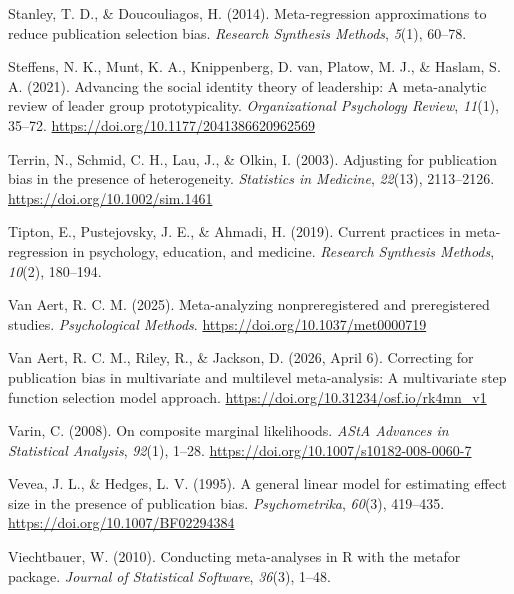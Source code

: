 \documentclass[
  american,
  man, donotrepeattitle,floatsintext]{apa7}
\newlength{\cslhangindent}
\newenvironment{CSLReferences}[2] %
 {\begin{list}{}{%
  \setlength{\itemindent}{0pt}
  \setlength{\leftmargin}{0pt}
  \setlength{\parsep}{0pt}
  \ifodd #1
   \setlength{\leftmargin}{\cslhangindent}
   \setlength{\itemindent}{-1\cslhangindent}
  \fi
  \setlength{\itemsep}{#2\baselineskip}}}
 {\end{list}}
\begin{document}
\begin{CSLReferences}{1}{0}
Stanley, T. D., \& Doucouliagos, H. (2014). Meta-regression approximations to reduce publication selection bias. \emph{Research Synthesis Methods}, \emph{5}(1), 60--78.

Steffens, N. K., Munt, K. A., Knippenberg, D. van, Platow, M. J., \& Haslam, S. A. (2021). Advancing the social identity theory of leadership: A meta-analytic review of leader group prototypicality. \emph{Organizational Psychology Review}, \emph{11}(1), 35--72. \url{https://doi.org/10.1177/2041386620962569}

Terrin, N., Schmid, C. H., Lau, J., \& Olkin, I. (2003). Adjusting for publication bias in the presence of heterogeneity. \emph{Statistics in Medicine}, \emph{22}(13), 2113--2126. \url{https://doi.org/10.1002/sim.1461}

Tipton, E., Pustejovsky, J. E., \& Ahmadi, H. (2019). Current practices in meta-regression in psychology, education, and medicine. \emph{Research Synthesis Methods}, \emph{10}(2), 180--194.

Van Aert, R. C. M. (2025). Meta-analyzing nonpreregistered and preregistered studies. \emph{Psychological Methods}. \url{https://doi.org/10.1037/met0000719}

Van Aert, R. C. M., Riley, R., \& Jackson, D. (2026, April 6). Correcting for publication bias in multivariate and multilevel meta-analysis: {A} multivariate step function selection model approach. \url{https://doi.org/10.31234/osf.io/rk4mn_v1}

Varin, C. (2008). On composite marginal likelihoods. \emph{AStA Advances in Statistical Analysis}, \emph{92}(1), 1--28. \url{https://doi.org/10.1007/s10182-008-0060-7}

Vevea, J. L., \& Hedges, L. V. (1995). A general linear model for estimating effect size in the presence of publication bias. \emph{Psychometrika}, \emph{60}(3), 419--435. \url{https://doi.org/10.1007/BF02294384}

Viechtbauer, W. (2010). {Conducting meta-analyses in R with the metafor package}. \emph{Journal of Statistical Software}, \emph{36}(3), 1--48.


\end{CSLReferences}
\end{document}
